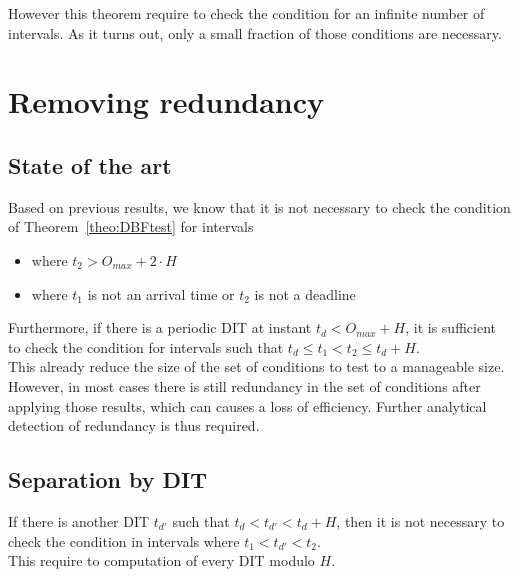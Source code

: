 \documentclass[a4paper,10pt]{article}
\begin{document}
However this theorem require to check the condition for an infinite number of intervals. As it turns out, only a small fraction of those conditions are necessary.

\section{Removing redundancy}

    \subsection{State of the art}

Based on previous results, we know that it is not necessary to check the condition of Theorem~\ref{theo:DBFtest} for intervals
\begin{itemize}
    \item where $t_2 > O_{max} + 2 \cdot H$
    \item where $t_1$ is not an arrival time or $t_2$ is not a deadline
\end{itemize}

Furthermore, if there is a periodic DIT at instant $t_d < O_{max} + H$, it is sufficient to check the condition for intervals such that $t_d \leqslant t_1 < t_2 \leqslant t_d + H$.\\

This already reduce the size of the set of conditions to test to a manageable size. However, in most cases there
is still redundancy in the set of conditions after applying those results, which can causes a loss of efficiency. Further analytical detection of redundancy is thus required.

    \subsection{Separation by DIT}

If there is another DIT $t_{d'}$ such that $t_d < t_{d'} < t_d + H$, then it is not necessary to check the condition in intervals where $t_1 < t_{d'} < t_2$.\\

This require to computation of every DIT modulo $H$.

% 
% 
\end{document}
